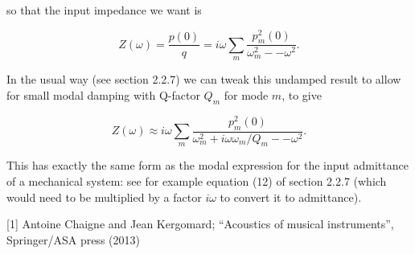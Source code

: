   \noindent{}so that the input impedance we want is 

  \begin{equation*}Z(\omega) = \dfrac{p(0)}{q} = i \omega 
  \sum_m{\dfrac{p_m^2(0)}{\omega_m^2 -- \omega^2}} . \tag{12}\end{equation*} 

  In the usual way (see section 2.2.7) we can tweak this undamped result to 
  allow for small modal damping with Q-factor $Q_m$ for mode $m$, to give 

  \begin{equation*}Z(\omega) \approx i \omega 
  \sum_m{\dfrac{p_m^2(0)}{\omega_m^2 + i \omega \omega_m/Q_m -- \omega^2}} . 
  \tag{13}\end{equation*} 

  This has exactly the same form as the modal expression for the input 
  admittance of a mechanical system: see for example equation (12) of section 
  2.2.7 (which would need to be multiplied by a factor $i \omega$ to convert it 
  to admittance). 

  \sectionreferences{}[1] Antoine Chaigne and Jean Kergomard; “Acoustics of 
  musical instruments”, Springer/ASA press (2013) 